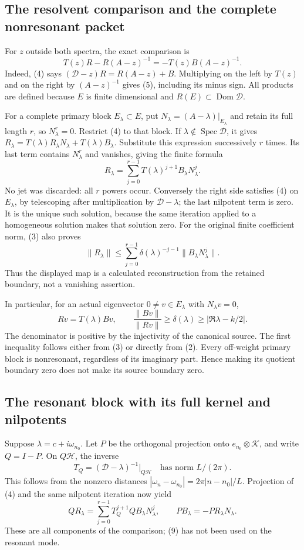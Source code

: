 \documentclass[10pt,a4paper,oneside]{report}
\begin{document}
\subsection{The resolvent comparison and the complete nonresonant packet}
For \(z\) outside both spectra, the exact comparison is
\[
 T(z)R-R(A-z)^{-1}=-T(z)B(A-z)^{-1}.
 \tag{5}
\]
Indeed, (4) says
\((\mathscr D-z)R=R(A-z)+B\). Multiplying on the left by
\(T(z)\) and on the right by \((A-z)^{-1}\) gives (5), including
its minus sign. All products are defined because \(E\) is finite
dimensional and \(R(E)\subset\operatorname{Dom}\mathscr D\).

For a complete primary block \(E_\lambda\subset E\), put
\(N_\lambda=(A-\lambda)|_{E_\lambda}\) and retain its full
length \(r\), so \(N_\lambda^r=0\). Restrict (4) to that block.
If \(\lambda\notin\operatorname{Spec}\mathscr D\), it gives
\(R_\lambda=T(\lambda)R_\lambda N_\lambda+T(\lambda)B_\lambda\).
Substitute this expression successively \(r\) times. Its last
term contains \(N_\lambda^r\) and vanishes, giving the finite formula
\[
 \boxed{R_\lambda=
 \sum_{j=0}^{r-1}T(\lambda)^{j+1}B_\lambda N_\lambda^j.}
 \tag{6}
\]
No jet was discarded: all \(r\) powers occur. Conversely the right
side satisfies (4) on \(E_\lambda\), by telescoping after
multiplication by \(\mathscr D-\lambda\); the last nilpotent term
is zero. It is the unique such solution, because the same iteration
applied to a homogeneous solution makes that solution zero.
For the original finite coefficient norm, (3) also proves
\[
 \|R_\lambda\|
 \le\sum_{j=0}^{r-1}\delta(\lambda)^{-j-1}
                     \|B_\lambda N_\lambda^j\|.
 \tag{7}
\]
Thus the displayed map is a calculated reconstruction from the
retained boundary, not a vanishing assertion.

In particular, for an actual eigenvector \(0\ne v\in E_\lambda\)
with \(N_\lambda v=0\),
\[
 Rv=T(\lambda)Bv,\qquad
 \frac{\|Bv\|}{\|Rv\|}\ge\delta(\lambda)
 \ge|\Re\lambda-k/2|.
 \tag{8}
\]
The denominator is positive by the injectivity of the canonical
source. The first inequality follows either from (3) or directly
from (2). Every off-weight primary block is nonresonant, regardless
of its imaginary part. Hence making its quotient boundary zero does
not make its source boundary zero.

\subsection{The resonant block with its full kernel and nilpotents}
Suppose \(\lambda=c+i\omega_{n_0}\). Let \(P\) be the orthogonal
projection onto \(e_{n_0}\otimes\mathcal K\), and write \(Q=I-P\).
On \(Q\mathscr H\), the inverse
\[
 T_Q=(\mathscr D-\lambda)^{-1}|_{Q\mathscr H}
 \quad\text{has norm }L/(2\pi).
 \tag{9}
\]
This follows from the nonzero distances
\(|\omega_n-\omega_{n_0}|=2\pi|n-n_0|/L\).
Projection of (4) and the same nilpotent iteration now yield
\[
 QR_\lambda=\sum_{j=0}^{r-1}T_Q^{j+1}QB_\lambda N_\lambda^j,
 \qquad
 PB_\lambda=-PR_\lambda N_\lambda.
 \tag{10}
\]
These are all components of the comparison; (9) has not been used
on the resonant mode.
\end{document}
